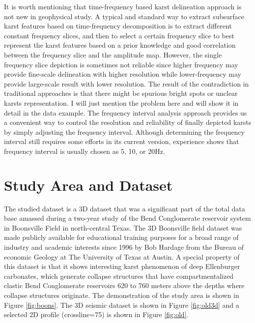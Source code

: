 It is worth mentioning that time-frequency based karst delineation approach is not new in geophysical study. A typical and standard way to extract subsurface karst features based on time-frequency decomposition is to extract different constant frequency slices, and then to select a certain frequency slice to best represent the karst features based on a prior knowledge and good correlation between the frequency slice and the amplitude map. However, the single frequency slice depiction is sometimes not  reliable since higher frequency may provide fine-scale delineation with higher resolution\new{,} while lower-frequency may provide large-scale result with lower resolution. The result of the contradiction in traditional approaches is that there might be spurious bright spots or unclear karsts representation. I will just mention the problem here and will show it in detail in the data example. The frequency interval analysis approach provides us a convenient way to control the resolution and reliability of finally depicted karsts by simply adjusting the frequency interval. Although determining the frequency interval still requires some efforts in its current version,  experience shows that frequency interval is usually chosen as 5, 10, or 20Hz.

\section{Study Area and Dataset}
The studied dataset is a 3D dataset that was a significant part of the total data base amassed during a two-year study of the Bend Conglomerate reservoir system in Boonsville Field in north-central Texas. The 3D Boonsville field dataset  was made publicly available for educational training purposes for a broad range of industry and academic interests since 1996 by Bob Hardage from the Bureau of economic Geology at The University of Texas at Austin. A special property of this dataset is that it shows interesting karst phenomenon of deep Ellenburger carbonates, which generate collapse structures that have compartmentalized clastic Bend Conglomerate reservoirs 620 to 760 meters above the depths where collapse structures originate. The demonstration of the study area is shown in Figure \ref{fig:boons}.  The 3D seismic dataset is shown in Figure \ref{fig:old3d} and a selected 2D profile (crossline=75) is shown in Figure \ref{fig:old}.  

